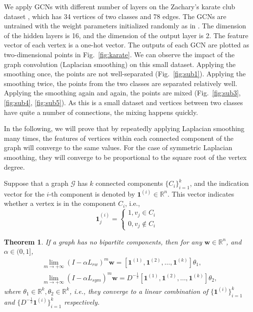 \documentclass[letterpaper]{article} \usepackage{aaai18}  \usepackage{times}  \usepackage{helvet}  \usepackage{courier}  \usepackage{url}  \usepackage{graphicx}  \usepackage{algorithm}
\begin{document}
We apply GCNs with different number of layers on the Zachary's karate club dataset \cite{zachary1977information}, which has 34 vertices of two classes and 78 edges. The GCNs are untrained with the weight parameters initialized randomly as in \cite{glorot2010understanding}. The dimension of the hidden layers is 16, and the dimension of the output layer is 2. The feature vector of each vertex is a one-hot vector. The outputs of each GCN are plotted as two-dimensional points in Fig.~\ref{fig:karate}. We can observe the impact of the graph convolution (Laplacian smoothing) on this small dataset. Applying the smoothing once, the points are not well-separated (Fig.~\ref{fig:sub1}). Applying the smoothing twice, the points from the two classes are separated relatively well. Applying the smoothing again and again, the points are mixed (Fig.~\ref{fig:sub3}, \ref{fig:sub4}, \ref{fig:sub5}). As this is a small dataset and vertices between two classes have quite a number of connections, the mixing happens quickly.












In the following, we will prove that by repeatedly applying Laplacian smoothing many times, the features of vertices within each connected component of the graph will converge to the same values. For the case of symmetric Laplacian smoothing, they will converge to be proportional to the square root of the vertex degree.

Suppose that a graph $\mathcal{G}$ has $k$ connected components $\{C_i\}_{i=1}^{k}$, and the indication vector for the $i$-th component is denoted by $\mathbf{1}^{(i)}\in\mathbb{R}^n$. This vector indicates whether a vertex is in the component $C_i$, i.e.,
\begin{equation}
    \mathbf{1}^{(i)}_j=\left\{
    \begin{array}{l}
        1, v_j \in C_i \\
        0, v_j \not\in C_i
       \end{array} \right.
\end{equation}
\newtheorem{theorem}{Theorem}
\begin{theorem}
    If a graph has no bipartite components, then for any $\mathbf{w}\in \mathbb{R}^n$, and $\alpha \in (0,1]$,
    \begin{align}
        &\lim_{m\to+\infty}{(I-\alpha L_{rw})}^m \mathbf{w} = [\mathbf{1}^{(1)}, \mathbf{1}^{(2)}, \dots, \mathbf{1}^{(k)}]\theta_1,\nonumber \\
        &\lim_{m\to+\infty}{(I-\alpha L_{sym})}^m \mathbf{w}   = D^{-\frac{1}{2}}[\mathbf{1}^{(1)}, \mathbf{1}^{(2)}, \dots, \mathbf{1}^{(k)}]\theta_2,\nonumber
    \end{align}
    where $\theta_1\in \mathbb{R}^k, \theta_2\in \mathbb{R}^k$, i.e., they converge to a linear combination of $\{\mathbf{1}^{(i)}\}_{i=1}^{k}$ and $\{D^{-\frac{1}{2}}\mathbf{1}^{(i)}\}_{i=1}^{k}$ respectively.
\end{theorem}
\end{document}
